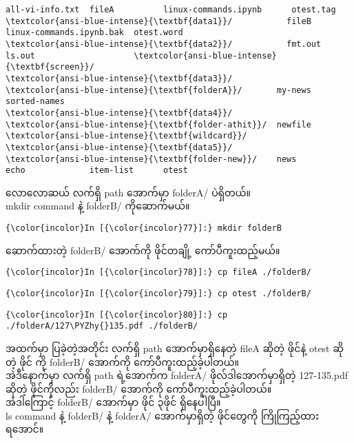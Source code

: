 \documentclass[11pt]{article}
\def\PYZhy{\char`\-}
\begin{document}
    \begin{Verbatim}[commandchars=\\\{\}]
all-vi-info.txt  fileA          linux-commands.ipynb      otest.tag
\textcolor{ansi-blue-intense}{\textbf{data1}}/           fileB          linux-commands.ipynb.bak  otest.word
\textcolor{ansi-blue-intense}{\textbf{data2}}/           fmt.out        ls.out                    \textcolor{ansi-blue-intense}{\textbf{screen}}/
\textcolor{ansi-blue-intense}{\textbf{data3}}/           \textcolor{ansi-blue-intense}{\textbf{folderA}}/       my-news                   sorted-names
\textcolor{ansi-blue-intense}{\textbf{data4}}/           \textcolor{ansi-blue-intense}{\textbf{folder-athit}}/  newfile                   \textcolor{ansi-blue-intense}{\textbf{wildcard}}/
\textcolor{ansi-blue-intense}{\textbf{data5}}/           \textcolor{ansi-blue-intense}{\textbf{folder-new}}/    news
echo             item-list      otest

    \end{Verbatim}

    လောလောဆယ် လက်ရှိ path အောက်မှာ folderA/ ပဲရှိတယ်။\\
mkdir command နဲ့ folderB/ ကိုဆောက်မယ်။

    \begin{Verbatim}[commandchars=\\\{\}]
{\color{incolor}In [{\color{incolor}77}]:} mkdir folderB
\end{Verbatim}

    ဆောက်ထားတဲ့ folderB/ အောက်ကို ဖိုင်တချို့ ကော်ပီကူးထည့်မယ်။

    \begin{Verbatim}[commandchars=\\\{\}]
{\color{incolor}In [{\color{incolor}78}]:} cp fileA ./folderB/
\end{Verbatim}

    \begin{Verbatim}[commandchars=\\\{\}]
{\color{incolor}In [{\color{incolor}79}]:} cp otest ./folderB/
\end{Verbatim}

    \begin{Verbatim}[commandchars=\\\{\}]
{\color{incolor}In [{\color{incolor}80}]:} cp ./folderA/127\PYZhy{}135.pdf ./folderB/
\end{Verbatim}

    အထက်မှာ ပြခဲ့တဲ့အတိုင်း လက်ရှိ path အောက်မှာရှိနေတဲ့ fileA ဆိုတဲ့
ဖိုင်နဲ့ otest ဆိုတဲ့ ဖိုင် ကို folderB/ အောက်ကို
ကော်ပီကူးထည့်ခဲ့ပါတယ်။\\
အဲဒီနောက်မှာ လက်ရှိ path ရဲ့အောက်က folderA/ ဖိုလ်ဒါအောက်မှာရှိတဲ့
127-135.pdf ဆိုတဲ့ ဖိုင်ကိုလည်း folderB/ အောက်ကို
ကော်ပီကူးထည့်ခဲ့ပါတယ်။\\
အဲဒါကြောင့် folderB/ အောက်မှာ ဖိုင် ၃ဖိုင် ရှိနေပါပြီ။\\
ls command နဲ့ folderB/ နဲ့ folderA/ အောက်မှာရှိတဲ့ ဖိုင်တွေကို
ကြိုကြည့်ထားရအောင်။
\end{document}
